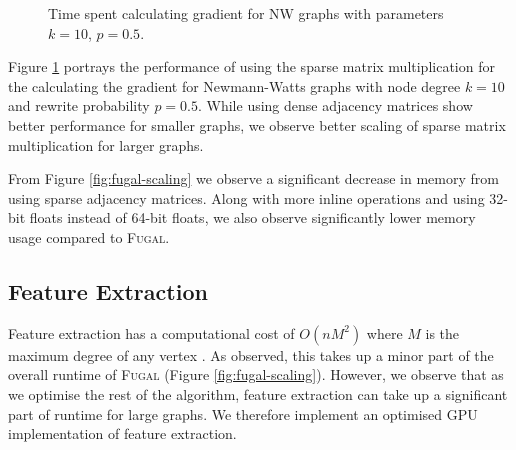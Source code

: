 \begin{figure}[H]
    \centering
    \caption{Time spent calculating gradient for NW graphs with parameters $k=10$, $p=0.5$.}
    \label{fig:sparse_speed}
\end{figure}

Figure \ref{fig:sparse_speed} portrays the performance of using the sparse matrix multiplication for the calculating the gradient for Newmann-Watts graphs with node degree $k = 10$ and rewrite probability $p = 0.5$. While using dense adjacency matrices show better performance for smaller graphs, we observe better scaling of sparse matrix multiplication for larger graphs.

From Figure \ref{fig:fugal-scaling} we observe a significant decrease in memory from using sparse adjacency matrices. Along with more inline operations and using 32-bit floats instead of 64-bit floats, we also observe significantly lower memory usage compared to \textsc{Fugal}.

\subsection{Feature Extraction}
Feature extraction has a computational cost of $O(nM^2)$ where $M$ is the maximum degree of any vertex \citep{fugal2024}. As observed, this takes up a minor part of the overall runtime of \textsc{Fugal} (Figure \ref{fig:fugal-scaling}). However, we observe that as we optimise the rest of the algorithm, feature extraction can take up a significant part of runtime for large graphs. We therefore implement an optimised GPU implementation of feature extraction.\\

